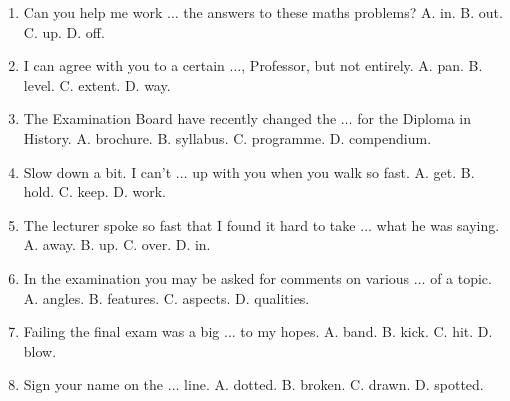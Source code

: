 \documentclass{article}
\numberwithin{equation}{section}
\begin{document}
\begin{enumerate}[leftmargin=5mm]
	\item Can you help me work $\ldots$ the answers to these maths problems? A. in. B. out. C. up. D. off.
	\item I can agree with you to a certain $\ldots$, Professor, but not entirely. A. pan. B. level. C. extent. D. way.
	\item The Examination Board have recently changed the $\ldots$ for the Diploma in History. A. brochure. B. syllabus. C. programme. D. compendium.
	\item Slow down a bit. I can't $\ldots$ up with you when you walk so fast. A. get. B. hold. C. keep. D. work.
	\item The lecturer spoke so fast that I found it hard to take $\ldots$ what he was saying. A. away. B. up. C. over. D. in.
	\item In the examination you may be asked for comments on various $\ldots$ of a topic. A. angles. B. features. C. aspects. D. qualities.
	\item Failing the final exam was a big $\ldots$ to my hopes. A. band. B. kick. C. hit. D. blow.
	\item Sign your name on the $\ldots$ line. A. dotted. B. broken. C. drawn. D. spotted.
\end{enumerate}


\printbibliography[heading=bibintoc]
	
\end{document}
